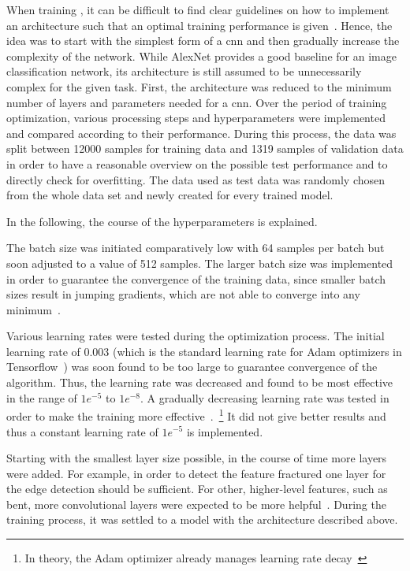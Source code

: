 When training , it can be difficult to find clear guidelines on how to implement an architecture such that an optimal training performance is given~\citep{heaton2015aifh,geron2019hands,bettilyon2018classify}. Hence, the idea was to start with the simplest form of a \acrshort{cnn} and then gradually increase the complexity of the network. While AlexNet provides a good baseline for an image classification network, its architecture is still assumed to be unnecessarily complex for the given task. First, the architecture was reduced to the minimum number of layers and parameters needed for a \acrshort{cnn}. Over the period of training optimization, various processing steps and hyperparameters were implemented and compared according to their performance. During this process, the data was split between 12000 samples for training data and 1319 samples of validation data in order to have a reasonable overview on the possible test performance and to directly check for overfitting. The data used as test data was randomly chosen from the whole data set and newly created for every trained model.
 
In the following, the course of the hyperparameters is explained.
 
\bigskip
The batch size was initiated comparatively low with 64 samples per batch but soon adjusted to a value of 512 samples. The larger batch size was implemented in order to guarantee the convergence of the training data, since smaller batch sizes result in jumping gradients, which are not able to converge into any minimum~\citep{bengio2012practical}.
 
Various learning rates were tested during the optimization process. The initial learning rate of 0.003 (which is the standard learning rate for Adam optimizers in Tensorflow~\citep{kingma2014adam,geron2019hands}) was soon found to be too large to guarantee convergence of the algorithm. Thus, the learning rate was decreased and found to be most effective in the range of \(1e^{-5}\) to \(1e^{-8}\). A gradually decreasing learning rate was tested in order to make the training more effective~\citep{bengio2012practical}.~\footnote{In theory, the Adam optimizer already manages learning rate decay~\citep{kingma2014adam}} It did not give better results and thus a constant learning rate of \(1e^{-5}\) is implemented.
 
Starting with the smallest layer size possible, in the course of time more layers were added. For example, in order to detect the feature fractured one layer for the edge detection should be sufficient. For other, higher-level features, such as bent, more convolutional layers were expected to be more helpful~\citep{geron2019hands}. During the training process, it was settled to a model with the architecture described above.
 
